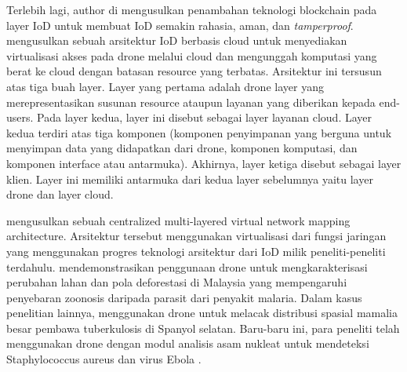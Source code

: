 Terlebih lagi, author di \citep{aggarwal2019new} mengusulkan penambahan teknologi blockchain pada layer IoD untuk membuat IoD semakin rahasia, aman, dan \emph{tamperproof}. \citet{qureshi2016dronemap} mengusulkan sebuah arsitektur IoD berbasis cloud untuk menyediakan virtualisasi akses pada drone melalui cloud dan mengunggah komputasi yang berat ke cloud dengan batasan resource yang terbatas. Arsitektur ini tersusun atas tiga buah layer. Layer yang pertama adalah drone layer yang merepresentasikan susunan resource ataupun layanan yang diberikan kepada end-users. Pada layer kedua, layer ini disebut sebagai layer layanan cloud. Layer kedua terdiri atas tiga komponen (komponen penyimpanan yang berguna untuk menyimpan data yang didapatkan dari drone, komponen komputasi, dan komponen interface atau antarmuka). Akhirnya, layer ketiga disebut sebagai layer klien. Layer ini memiliki antarmuka dari kedua layer sebelumnya yaitu layer drone dan layer cloud. 

\citet{zhang2020multidomain} mengusulkan sebuah centralized multi-layered virtual network mapping architecture. Arsitektur tersebut menggunakan virtualisasi dari fungsi jaringan yang menggunakan progres teknologi arsitektur dari IoD milik peneliti-peneliti terdahulu. \citet{fornace2014mapping} mendemonstrasikan penggunaan drone untuk mengkarakterisasi perubahan lahan dan pola deforestasi di Malaysia yang mempengaruhi penyebaran zoonosis daripada parasit dari penyakit malaria. Dalam kasus penelitian lainnya, \citet{barasona2014unmanned} menggunakan drone untuk melacak distribusi spasial mamalia besar pembawa tuberkulosis di Spanyol selatan. Baru-baru ini, para peneliti telah menggunakan drone dengan modul analisis asam nukleat untuk mendeteksi Staphylococcus aureus dan virus Ebola \citep{priye2016lab}.
